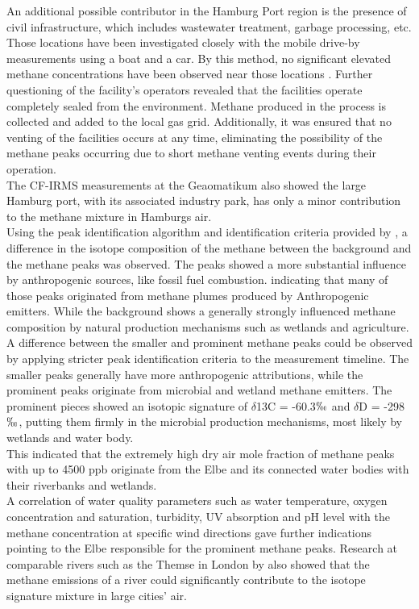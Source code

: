 An additional possible contributor in the Hamburg Port region is the presence of civil infrastructure, which includes wastewater treatment, garbage processing, etc. Those locations have been investigated closely with the mobile drive-by measurements using a boat and a car. By this method, no significant elevated methane concentrations have been observed near those locations \cite{Forstmaier.2023}. Further questioning of the facility's operators revealed that the facilities operate completely sealed from the environment. Methane produced in the process is collected and added to the local gas grid. Additionally, it was ensured that no venting of the facilities occurs at any time, eliminating the possibility of the methane peaks occurring due to short methane venting events during their operation.\\
The CF-IRMS measurements at the Geaomatikum also showed the large Hamburg port, with its associated industry park, has only a minor contribution to the methane mixture in Hamburgs air.\\
Using the peak identification algorithm and identification criteria provided by \cite{Menoud.2021}, a difference in the isotope composition of the methane between the background and the methane peaks was observed. The peaks showed a more substantial influence by anthropogenic sources, like fossil fuel combustion. indicating that many of those peaks originated from methane plumes produced by Anthropogenic emitters. While the background shows a generally strongly influenced methane composition by natural production mechanisms such as wetlands and agriculture.\\
A difference between the smaller and prominent methane peaks could be observed by applying stricter peak identification criteria to the measurement timeline. The smaller peaks generally have more anthropogenic attributions, while the prominent peaks originate from microbial and wetland methane emitters. The prominent pieces showed an isotopic signature of $\delta$13C = -60.3$\permil$ and $\delta$D = -298$\permil$, putting them firmly in the microbial production mechanisms, most likely by wetlands and water body. \\
This indicated that the extremely high dry air mole fraction of methane peaks with up to 4500 ppb originate from the Elbe and its connected water bodies with their riverbanks and wetlands.\\
A correlation of water quality parameters such as water temperature, oxygen concentration and saturation, turbidity, UV absorption and pH level with the methane concentration at specific wind directions gave further indications pointing to the Elbe responsible for the prominent methane peaks. Research at comparable rivers such as the Themse in London by \cite{Zazzeri.2017} also showed that the methane emissions of a river could significantly contribute to the isotope signature mixture in large cities' air.\\
